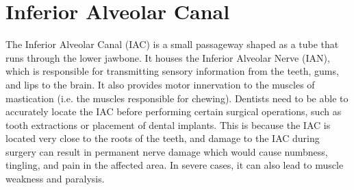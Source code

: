 \section{Inferior Alveolar Canal}
The Inferior Alveolar Canal (IAC) is a small passageway shaped as a tube that
runs through the lower jawbone. It houses the Inferior Alveolar Nerve (IAN),
which is responsible for transmitting sensory information from the teeth, gums, and lips to the brain. It also provides motor innervation to the muscles of
mastication (i.e. the muscles responsible for chewing). Dentists need to be able
to accurately locate the IAC before performing certain surgical operations, such
as tooth extractions or placement of dental implants. This is because the IAC is
located very close to the roots of the teeth, and damage to the IAC during
surgery can result in permanent nerve damage which would cause numbness,
tingling, and pain in the affected area. In severe cases, it can also lead to
muscle weakness and paralysis.

